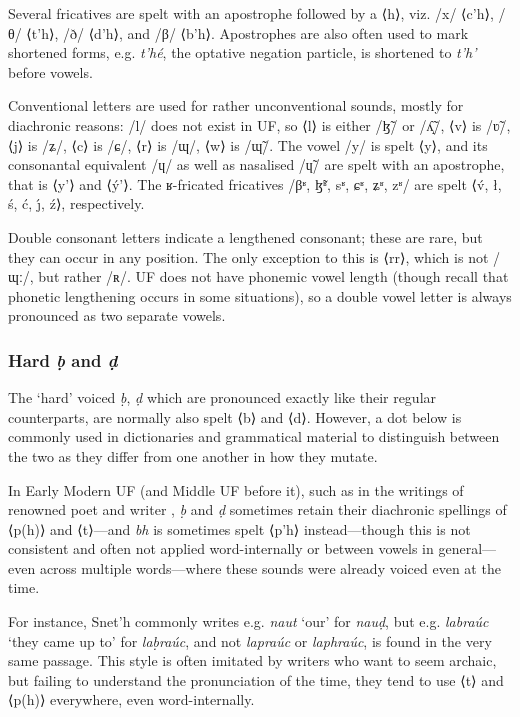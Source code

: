 \documentclass[a4paper, 12pt, twoside, final]{article}
\let \w \textit
\begin{document}
Several fricatives are spelt with an apostrophe followed by a ⟨h⟩, viz. /x/ ⟨c’h⟩, /θ/ ⟨t’h⟩, /ð/ ⟨d’h⟩,
and /β/ ⟨b’h⟩. Apostrophes are also often used to mark shortened forms, e.g. \w{t’hé},
the optative negation particle, is shortened to \w{t’h’} before vowels.

Conventional letters are used for rather unconventional sounds, mostly for diachronic reasons:
/l/ does not exist in UF, so ⟨l⟩ is either /ɮ̃/ or /ʎ̝̃/, ⟨v⟩ is /ʋ̃/, ⟨j⟩ is /ʑ/, ⟨c⟩ is /ɕ/, ⟨r⟩ is /ɰ/, ⟨w⟩ is /ɰ̃/. The vowel
/y/ is spelt ⟨y⟩, and its consonantal equivalent /ɥ/ as well as nasalised /ɥ̃/ are spelt with an apostrophe, that is
⟨y’⟩ and ⟨ý’⟩. The ʁ-fricated fricatives /βʶ, ɮ̃ʶ, sʶ, ɕʶ, ʑʶ, zʶ/
are spelt ⟨v́, ł, ś, ć, ȷ́, ź⟩, respectively.

Double consonant letters indicate a lengthened consonant; these are rare, but they can occur in any position. The only
exception to this is ⟨rr⟩, which is not /ɰː/, but rather /ʀ/. UF does not have phonemic vowel length (though recall
that phonetic lengthening occurs in some situations), so a double vowel letter is always pronounced as two separate vowels.

\subsubsection{Hard \textit{ḅ} and \textit{ḍ}}
The ‘hard’ voiced \w{ḅ}, \w{ḍ} which are pronounced exactly like their regular counterparts, are normally also spelt ⟨b⟩ and
⟨d⟩. However, a dot below is commonly used in dictionaries and grammatical material to distinguish between the two
as they differ from one another in how they mutate.

In Early Modern UF (and Middle UF before it), such as in the writings of renowned poet and writer ,
\w{ḅ} and \w{ḍ} sometimes retain their diachronic spellings of ⟨p(h)⟩ and ⟨t⟩—and \w{bh} is sometimes spelt ⟨p’h⟩ instead—though
this is not consistent and often not applied word-internally or between vowels in general—even across multiple words—where
these sounds were already voiced even at the time.

For instance, Snet’h commonly writes e.g. \w{naut} ‘our’ for \w{nauḍ}, but e.g. \w{labraúc} ‘they came up to’ for \w{laḅraúc}, and not
\w{lapraúc} or \w{laphraúc}, is found in the very same passage. This style is often imitated by writers who want to seem archaic, but failing to
understand the pronunciation of the time, they tend to use ⟨t⟩ and ⟨p(h)⟩ everywhere, even word-internally.
\end{document}
